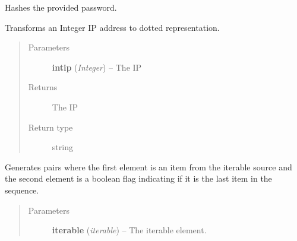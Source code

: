 \documentclass[letterpaper,10pt,english]{sphinxmanual}
\begin{document}

\begin{fulllineitems}
\label{utils:utils.HashPassword}
Hashes the provided password.

\end{fulllineitems}


\begin{fulllineitems}
\label{utils:utils.IntToDottedIP}
Transforms an Integer IP address to dotted representation.
\begin{quote}\begin{description}
\item[{Parameters}] \leavevmode
\textbf{intip} (\emph{Integer}) -- The IP

\item[{Returns}] \leavevmode
The IP

\item[{Return type}] \leavevmode
string

\end{description}\end{quote}

\end{fulllineitems}


\begin{fulllineitems}
\label{utils:utils.IterIsLast}
Generates pairs where the first element is an item from the iterable
source and the second element is a boolean flag indicating if it is the
last item in the sequence.
\begin{quote}\begin{description}
\item[{Parameters}] \leavevmode
\textbf{iterable} (\emph{iterable}) -- The iterable element.

\end{description}\end{quote}

\end{fulllineitems}

\end{document}
